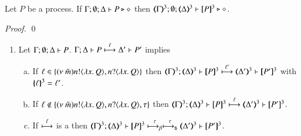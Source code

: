 \begin{proposition}\rm
	\label{prop:typepres_HOpp_to_HOp}
	Let $P$ be a \HOpp process.
	If $\Gamma; \emptyset; \Delta \vdash P \triangleright \diamond$ then 
	$\tmap{\Gamma}{3}; \emptyset; \tmap{\Delta}{3} \proves \pmap{P}{3} \hastype \Proc$. 
\end{proposition}

\begin{proof}
	\qed
\end{proof}

\begin{proposition}\rm
	\label{prop:op_corr_HOpp_to_HOp}
	\begin{enumerate}
		\item	Let $\Gamma; \emptyset; \Delta \vdash P$.
			$\Gamma; \Delta \vdash P \stackrel{\ell}{\longmapsto} \Delta' \vdash P'$ implies
%
			\begin{enumerate}[a)]
				\item	If $\ell \in \{(\nu\ \tilde{m}) n ! \langle \lambda x.\,Q \rangle, n ? \langle \lambda x.\,Q \rangle\}$ then
					$\horel{\tmap{\Gamma}{3}}{\tmap{\Delta}{3}}{\pmap{P}{3}}{\hby{\ell'}}
					{\tmap{\Delta'}{3}}{\pmap{P'}{3}}$ with $\{\!\!\{\ell\}\!\!\}^{3} = \ell'$.

%
%

				\item	If $\ell \notin \{(\nu\ \tilde{m}) n ! \langle \lambda x.\,Q \rangle, n ? \langle \lambda x.\,Q \rangle, \tau\}$ then
					$\horel{\tmap{\Gamma}{3}}{\tmap{\Delta}{3}}{\pmap{P}{3}}{\hby{\ell}}
					{\tmap{\Delta'}{3}}{\pmap{P'}{3}}$.

				\item	If $\stackrel{\ell}{\longmapsto}$ is a \betatran then
					$\horel{\tmap{\Gamma}{3}}{\tmap{\Delta}{3}}{\pmap{P}{3}}{\bhby{\tau} \shby{\tau}}
					{\tmap{\Delta'}{3}}{\pmap{P'}{3}}$.


\end{enumerate}
\end{enumerate}
\end{proposition}
